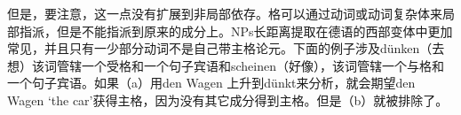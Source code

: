 但是，要注意，这一点没有扩展到非局部依存。格可以通过动词或动词复杂体来局部指派，但是不能指派到原来的成分上。NPs长距离提取在德语的西部变体中更加常见，并且只有一少部分动词不是自己带主格论元。下面的例子涉及dünken（去想）该词管辖一个受格和一个句子宾语和scheinen（好像），该词管辖一个与格和一个句子宾语。如果（a）用den Wagen 上升到dünkt来分析，就会期望den Wagen ‘the car’获得主格，因为没有其它成分得到主格。但是（b）就被排除了。

\eal
{}
\zl

